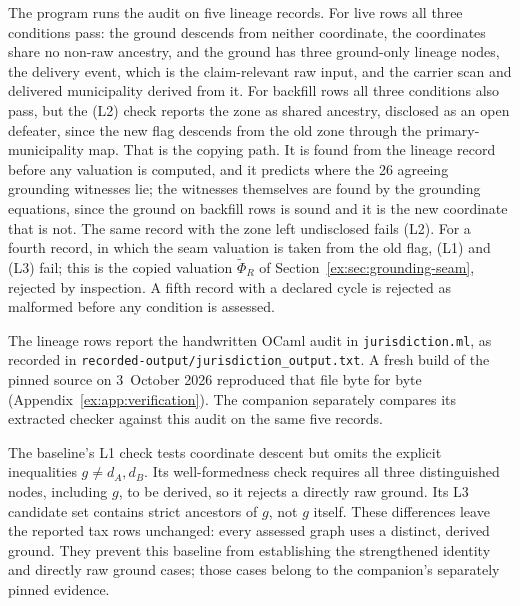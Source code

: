 \documentclass[11pt]{article}
\theoremstyle{definition}
\newcommand{\code}[1]{\texttt{#1}}
\begin{document}
The program runs the audit on five lineage records. For live rows all three conditions pass: the ground descends from neither coordinate, the coordinates share no non-raw ancestry, and the ground has three ground-only lineage nodes, the delivery event, which is the claim-relevant raw input, and the carrier scan and delivered municipality derived from it. For backfill rows all three conditions also pass, but the (L2) check reports the zone as shared ancestry, disclosed as an open defeater, since the new flag descends from the old zone through the primary-municipality map. That is the copying path. It is found from the lineage record before any valuation is computed, and it predicts where the 26 agreeing grounding witnesses lie; the witnesses themselves are found by the grounding equations, since the ground on backfill rows is sound and it is the new coordinate that is not. The same record with the zone left undisclosed fails (L2). For a fourth record, in which the seam valuation is taken from the old flag, (L1) and (L3) fail; this is the copied valuation $\widetilde\Phi_R$ of Section~\ref{ex:sec:grounding-seam}, rejected by inspection. A fifth record with a declared cycle is rejected as malformed before any condition is assessed.

The lineage rows report the handwritten OCaml audit in \code{jurisdiction.ml}, as recorded in \nolinkurl{recorded-output/jurisdiction_output.txt}. A fresh build of the pinned source on 3~October 2026 reproduced that file byte for byte (Appendix~\ref{ex:app:verification}). The companion separately compares its extracted checker against this audit on the same five records.

The baseline's L1 check tests coordinate descent but omits the explicit inequalities $g\neq d_A,d_B$. Its well-formedness check requires all three distinguished nodes, including $g$, to be derived, so it rejects a directly raw ground. Its L3 candidate set contains strict ancestors of $g$, not $g$ itself. These differences leave the reported tax rows unchanged: every assessed graph uses a distinct, derived ground. They prevent this baseline from establishing the strengthened identity and directly raw ground cases; those cases belong to the companion's separately pinned evidence.
\end{document}
